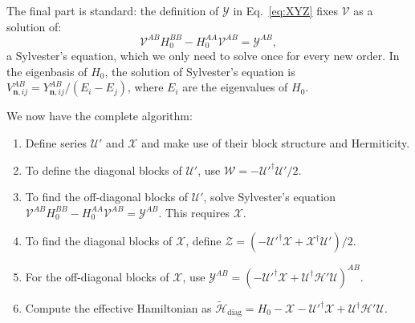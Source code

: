 The final part is standard: the definition of $\mathcal{Y}$ in
Eq.~\eqref{eq:XYZ} fixes $\mathcal{V}$ as a solution of:
%
\begin{equation}
\label{eq:sylvester}
\mathcal{V}^{AB}H_0^{BB} - H_0^{AA} \mathcal{V}^{AB} = \mathcal{Y}^{AB},
\end{equation}
%
a Sylvester's equation, which we only need to solve once for every new order.
In the eigenbasis of $H_0$, the solution of Sylvester's equation is
$V^{AB}_{\mathbf{n}, ij} = Y^{AB}_{\mathbf{n}, ij}/(E_i - E_j)$, where $E_i$
are the eigenvalues of $H_0$.

We now have the complete algorithm:
%
\begin{enumerate}
    \item Define series $\mathcal{U}'$ and $\mathcal{X}$ and make use of their block structure and Hermiticity.
    \item To define the diagonal blocks of $\mathcal{U}'$, use $\mathcal{W} = -\mathcal{U}'^\dagger\mathcal{U}'/2$.
    \item To find the off-diagonal blocks of $\mathcal{U}'$, solve Sylvester's equation $\mathcal{V}^{AB}H_0^{BB} - H_0^{AA}\mathcal{V}^{AB} = \mathcal{Y}^{AB}$.
      This requires $\mathcal{X}$.
    \item To find the diagonal blocks of $\mathcal{X}$, define $\mathcal{Z} = (-\mathcal{U}'^\dagger\mathcal{X} + \mathcal{X}^\dagger\mathcal{U}')/2$.
    \item For the off-diagonal blocks of $\mathcal{X}$, use $\mathcal{Y}^{AB} =
    (-\mathcal{U}'^\dagger\mathcal{X} +
     \mathcal{U}^\dagger\mathcal{H}'\mathcal{U})^{AB}$.
    \item  Compute the effective Hamiltonian as $\tilde{\mathcal{H}}_{\textrm{diag}} = H_0 - \mathcal{X} - \mathcal{U}'^\dagger \mathcal{X} + \mathcal{U}^\dagger\mathcal{H'}\mathcal{U}$.
\end{enumerate}

